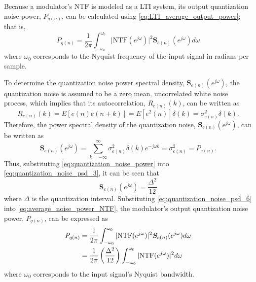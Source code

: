 Because a \DS modulator's NTF is modeled as a LTI system, its output quantization noise
power, $P_{q(n)}$, can be calculated using \eqref{eq:LTI_average_output_power}; that is,
\begin{equation}\label{eq:average_noise_power_NTF}
 P_{q(n)}=\frac{1}{2\pi}\int_{-\omega_0}^{\omega_0}{\lvert
\text{NTF}(e^{j\omega})\rvert^2\bm{S}_{e(n)}(e^{j\omega})d\omega}
\end{equation}
where $\omega_0$ corresponds to the Nyquist frequency of the input signal in radians per
sample.

To determine the quantization noise power spectral density, $\bm{S}_{e(n)}(e^{j\omega})$,
the quantization noise is assumed to be a zero mean, uncorrelated white noise process,
which implies that its autocorrelation, $R_{e(n)}(k)$, can be written as
\begin{equation}\label{eq:quantization_noise_psd_2}
R_{e(n)}(k)=E\left[e(n)e(n+k)\right]=E\left[e^2(n)\right]\delta(k)=\sigma^2_{e(n)}
\delta(k).
\end{equation}
Therefore, the power spectral density of the quantization noise,
$\bm{S}_{e(n)}(e^{j\omega})$, can be written as
\begin{equation}\label{eq:quantization_noise_psd_3}
\bm{S}_{e(n)}(e^{j\omega})=\sum_{k=-\infty}^{\infty}\sigma^2_{e(n)}
\delta(k)e^{-j\omega k}=\sigma^2_{e(n)}=P_{e(n)}.
\end{equation}
Thus, substituting \eqref{eq:quantization_noise_power} into
\eqref{eq:quantization_noise_psd_3}, it can be seen that 
\begin{equation}\label{eq:quantization_noise_psd_6}
\bm{S}_{e(n)}(e^{j\omega})=\frac{\Delta^2}{12}
\end{equation}
where $\Delta$ is the quantization interval. Substituting
\eqref{eq:quantization_noise_psd_6} into \eqref{eq:average_noise_power_NTF}, the  \DS
modulator's output quantization noise power, $P_{q(n)}$, can be expressed as
\begin{equation}\label{eq:average_noise_power_NTF_2}
\begin{split}
P_{q(n)}& = \frac{1}{2\pi}\int_{-\omega_0}^{\omega_0}{
\lvert
\mathop\text{NTF}(e^{j\omega})\rvert^2\bm{S}_{e(n)}(e^{j\omega})d\omega}\\
&
=\frac{1}{2\pi}\left(\frac{\Delta^2}{12}\right)\int_{-\omega_0}^{\omega_0}{
\lvert\mathop\text{NTF}(e^{j\omega})\rvert^2d\omega}
\end{split}
\end{equation}
where $\omega_0$ corresponds to the input signal's Nyquist bandwidth.

